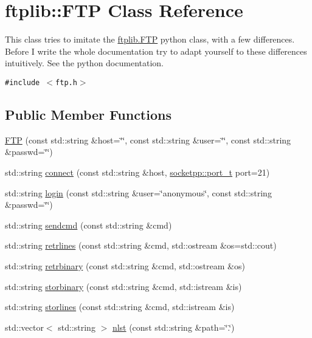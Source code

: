 \hypertarget{classftplib_1_1FTP}{
\section{ftplib::FTP Class Reference}
\label{classftplib_1_1FTP}
}
This class tries to imitate the \hyperlink{classftplib_1_1FTP}{ftplib.FTP} python class, with a few differences. Before I write the whole documentation try to adapt yourself to these differences intuitively. See the python documentation.  


{\tt \#include $<$ftp.h$>$}

\subsection*{Public Member Functions}
\begin{CompactItemize}
\item 
\hyperlink{classftplib_1_1FTP_7f153b44f41536e85297b08ed65b948e}{FTP} (const std::string \&host=\char`\"{}\char`\"{}, const std::string \&user=\char`\"{}\char`\"{}, const std::string \&passwd=\char`\"{}\char`\"{})
\item 
std::string \hyperlink{classftplib_1_1FTP_fbd3444a33e5dd055474c9a0d6aabba5}{connect} (const std::string \&host, \hyperlink{namespacesocketpp_5517ef80f249b891a2ba64b95fc1e723}{socketpp::port\_\-t} port=21)
\item 
std::string \hyperlink{classftplib_1_1FTP_dc39751d00808d35183fb19c483b3589}{login} (const std::string \&user=\char`\"{}anonymous\char`\"{}, const std::string \&passwd=\char`\"{}\char`\"{})
\item 
std::string \hyperlink{classftplib_1_1FTP_5a876d670107df4b5924238450440eee}{sendcmd} (const std::string \&cmd)
\item 
std::string \hyperlink{classftplib_1_1FTP_b04e374d4835e124959cee085df3fa4e}{retrlines} (const std::string \&cmd, std::ostream \&os=std::cout)
\item 
std::string \hyperlink{classftplib_1_1FTP_ad060fdb45fec7ccd5949e475df96982}{retrbinary} (const std::string \&cmd, std::ostream \&os)
\item 
std::string \hyperlink{classftplib_1_1FTP_37c828c7d98c7da3fe3b936526118416}{storbinary} (const std::string \&cmd, std::istream \&is)
\item 
std::string \hyperlink{classftplib_1_1FTP_956c5fa0546d7a6a2db0b4dee28f6868}{storlines} (const std::string \&cmd, std::istream \&is)
\item 
std::vector$<$ std::string $>$ \hyperlink{classftplib_1_1FTP_a793fa113ee6fc82e3db3b7ed769ff3f}{nlst} (const std::string \&path=\char`\"{}.\char`\"{})

\end{CompactItemize}
